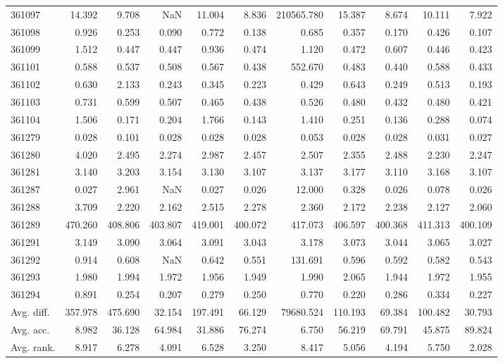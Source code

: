 \begin{tabular}{lrrrrrrrrrr}
361097 & 14.392 & 9.708 & NaN & 11.004 & 8.836 & 210565.780 & 15.387 & 8.674 & 10.111 & 7.922 \\
361098 & 0.926 & 0.253 & 0.090 & 0.772 & 0.138 & 0.685 & 0.357 & 0.170 & 0.426 & 0.107 \\
361099 & 1.512 & 0.447 & 0.447 & 0.936 & 0.474 & 1.120 & 0.472 & 0.607 & 0.446 & 0.423 \\
361101 & 0.588 & 0.537 & 0.508 & 0.567 & 0.438 & 552.670 & 0.483 & 0.440 & 0.588 & 0.433 \\
361102 & 0.630 & 2.133 & 0.243 & 0.345 & 0.223 & 0.429 & 0.643 & 0.249 & 0.513 & 0.193 \\
361103 & 0.731 & 0.599 & 0.507 & 0.465 & 0.438 & 0.526 & 0.480 & 0.432 & 0.480 & 0.421 \\
361104 & 1.506 & 0.171 & 0.204 & 1.766 & 0.143 & 1.410 & 0.251 & 0.136 & 0.288 & 0.074 \\
361279 & 0.028 & 0.101 & 0.028 & 0.028 & 0.028 & 0.053 & 0.028 & 0.028 & 0.031 & 0.027 \\
361280 & 4.020 & 2.495 & 2.274 & 2.987 & 2.457 & 2.507 & 2.355 & 2.488 & 2.230 & 2.247 \\
361281 & 3.140 & 3.203 & 3.154 & 3.130 & 3.107 & 3.137 & 3.177 & 3.110 & 3.168 & 3.107 \\
361287 & 0.027 & 2.961 & NaN & 0.027 & 0.026 & 12.000 & 0.328 & 0.026 & 0.078 & 0.026 \\
361288 & 3.709 & 2.220 & 2.162 & 2.515 & 2.278 & 2.360 & 2.172 & 2.238 & 2.127 & 2.060 \\
361289 & 470.260 & 408.806 & 403.807 & 419.001 & 400.072 & 417.073 & 406.597 & 400.368 & 411.313 & 400.109 \\
361291 & 3.149 & 3.090 & 3.064 & 3.091 & 3.043 & 3.178 & 3.073 & 3.044 & 3.065 & 3.027 \\
361292 & 0.914 & 0.608 & NaN & 0.642 & 0.551 & 131.691 & 0.596 & 0.592 & 0.582 & 0.543 \\
361293 & 1.980 & 1.994 & 1.972 & 1.956 & 1.949 & 1.990 & 2.065 & 1.944 & 1.972 & 1.955 \\
361294 & 0.891 & 0.254 & 0.207 & 0.279 & 0.250 & 0.770 & 0.220 & 0.286 & 0.334 & 0.227 \\
Avg. diff. & 357.978 & 475.690 & 32.154 & 197.491 & 66.129 & 79680.524 & 110.193 & 69.384 & 100.482 & 30.793 \\
Avg. acc. & 8.982 & 36.128 & 64.984 & 31.886 & 76.274 & 6.750 & 56.219 & 69.791 & 45.875 & 89.824 \\
Avg. rank. & 8.917 & 6.278 & 4.091 & 6.528 & 3.250 & 8.417 & 5.056 & 4.194 & 5.750 & 2.028 \\
\bottomrule
\end{tabular}
